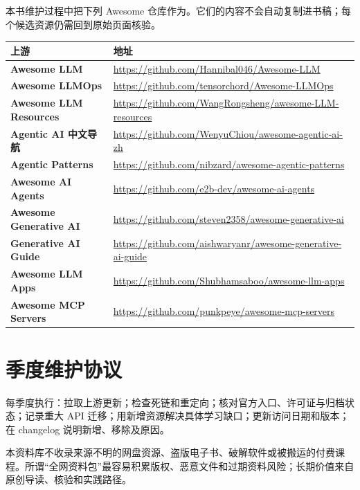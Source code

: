 本书维护过程中把下列 Awesome 仓库作为。它们的内容不会自动复制进书稿；每个候选资源仍需回到原始页面核验。

\begin{longtable}{>{\bfseries}p{} p{}}
\toprule
上游 & 地址 \\
\midrule
Awesome LLM & \url{https://github.com/Hannibal046/Awesome-LLM} \\
Awesome LLMOps & \url{https://github.com/tensorchord/Awesome-LLMOps} \\
Awesome LLM Resources & \url{https://github.com/WangRongsheng/awesome-LLM-resources} \\
Agentic AI 中文导航 & \url{https://github.com/WenyuChiou/awesome-agentic-ai-zh} \\
Agentic Patterns & \url{https://github.com/nibzard/awesome-agentic-patterns} \\
Awesome AI Agents & \url{https://github.com/e2b-dev/awesome-ai-agents} \\
Awesome Generative AI & \url{https://github.com/steven2358/awesome-generative-ai} \\
Generative AI Guide & \url{https://github.com/aishwaryanr/awesome-generative-ai-guide} \\
Awesome LLM Apps & \url{https://github.com/Shubhamsaboo/awesome-llm-apps} \\
Awesome MCP Servers & \url{https://github.com/punkpeye/awesome-mcp-servers} \\
\bottomrule
\end{longtable}

\section{季度维护协议}

每季度执行：拉取上游更新；检查死链和重定向；核对官方入口、许可证与归档状态；记录重大 API 迁移；用新增资源解决具体学习缺口；更新访问日期和版本；在 changelog 说明新增、移除及原因。

\begin{warningbox}
本资料库不收录来源不明的网盘资源、盗版电子书、破解软件或被搬运的付费课程。所谓“全网资料包”最容易积累版权、恶意文件和过期资料风险；长期价值来自原创导读、核验和实践路径。
\end{warningbox}
